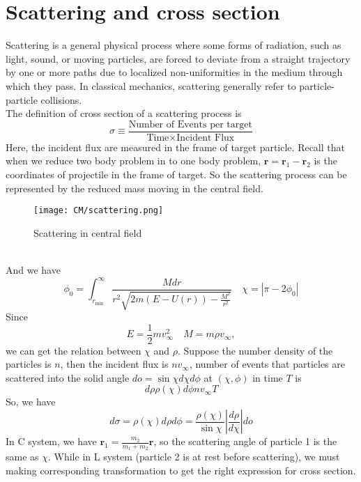 \section{Scattering and cross section}
Scattering is a general physical process where some forms of radiation, such as light, sound, or moving particles, are forced to deviate from a straight trajectory by one or more paths due to localized non-uniformities in the medium through which they pass.  In classical mechanics, scattering generally refer to particle-particle collisions. \\
The definition of cross section  of a scattering process is
\[\sigma \equiv \frac{\mbox{Number of Events per target}}{\mbox{Time} \times \mbox{Incident Flux}}\]
Here, the incident flux are measured in the frame of target particle. Recall that when we reduce two body problem in to one body problem, $\bm{r} = \bm{r}_1 - \bm{r}_2$ is the coordinates of projectile in the frame of target. So the scattering process can be represented by the reduced mass moving in the central field. 
\begin{figure}[!h]
	\centering
	\texttt{[image: CM/scattering.png]}
	\caption{Scattering in central field}
\end{figure}\\
And we have
\[\phi_0 = \int_{r_{\mathrm{min}}}^{\infty} \frac{Mdr}{r^2 \sqrt{2m(E-U(r))-\frac{M^2}{r^2}}} \quad \chi = |\pi - 2\phi_0|\]
Since
\[E = \frac{1}{2}m v_{\infty}^2 \quad M = m\rho v_{\infty},\]
we can get the relation between  $\chi$ and $\rho$. Suppose the number density of the particles is $n$, then the incident flux is $nv_{\infty}$, number of events that particles are scattered into the solid angle $do = \sin\chi d\chi d\phi$ at $(\chi,\phi)$ in time $T$ is
\[d\rho \rho(\chi) d\phi nv_{\infty} T \]
So, we have
\[d\sigma = \rho(\chi) d\rho d\phi = \frac{\rho(\chi)}{\sin\chi} \left| \frac{d\rho}{d\chi} \right| do\]
In C system, we have $\bm{r}_1 = \frac{m_2}{m_1+m_2} \bm{r}$, so the scattering angle of particle 1 is the same as $\chi$. While in L system (particle 2 is at rest before scattering), we must making corresponding transformation to get the right expression for cross section.

